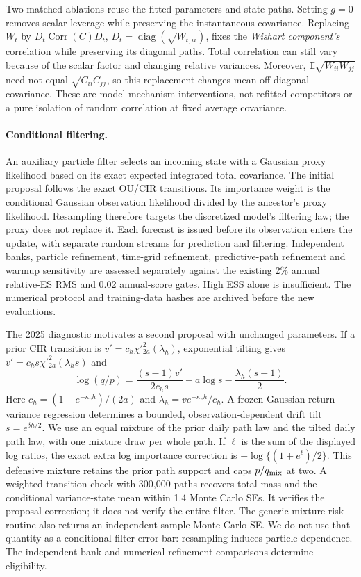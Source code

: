 \documentclass[11pt]{article}
\theoremstyle{definition}\newtheorem{definition}[theorem]{Definition}
\theoremstyle{remark}\newtheorem{remark}[theorem]{Remark}
\newcommand{\E}{\mathbb E}\newcommand{\Prob}{\mathbb P}\newcommand{\R}{\mathbb R}
\begin{document}
Two matched ablations reuse the fitted parameters and state paths. Setting $g=0$ removes scalar leverage while preserving the instantaneous covariance. Replacing $W_t$ by $D_t\operatorname{Corr}(C)D_t$, $D_t=\operatorname{diag}(\sqrt{W_{t,ii}})$, fixes the \emph{Wishart component's} correlation while preserving its diagonal paths. Total correlation can still vary because of the scalar factor and changing relative variances. Moreover, $\E\sqrt{W_{ii}W_{jj}}$ need not equal $\sqrt{C_{ii}C_{jj}}$, so this replacement changes mean off-diagonal covariance. These are model-mechanism interventions, not refitted competitors or a pure isolation of random correlation at fixed average covariance.

\paragraph{Conditional filtering.}
An auxiliary particle filter selects an incoming state with a Gaussian proxy likelihood based on its exact expected integrated total covariance. The initial proposal follows the exact OU/CIR transitions. Its importance weight is the conditional Gaussian observation likelihood divided by the ancestor's proxy likelihood. Resampling therefore targets the discretized model's filtering law; the proxy does not replace it. Each forecast is issued before its observation enters the update, with separate random streams for prediction and filtering. Independent banks, particle refinement, time-grid refinement, predictive-path refinement and warmup sensitivity are assessed separately against the existing 2\% annual relative-ES RMS and 0.02 annual-score gates. High ESS alone is insufficient. The numerical protocol and training-data hashes are archived before the new evaluations.

The 2025 diagnostic motivates a second proposal with unchanged parameters. If a prior CIR transition is $v'=c_h\chi'^2_{2a}(\lambda_h)$, exponential tilting gives $v'=c_hs\chi'^2_{2a}(\lambda_hs)$ and
\[
 \log(q/p)=\frac{(s-1)v'}{2c_hs}-a\log s-\frac{\lambda_h(s-1)}2.
\]
Here $c_h=(1-e^{-\kappa_vh})/(2a)$ and $\lambda_h=v e^{-\kappa_vh}/c_h$. A frozen Gaussian return--variance regression determines a bounded, observation-dependent drift tilt $s=e^{\delta h/2}$. We use an equal mixture of the prior daily path law and the tilted daily path law, with one mixture draw per whole path. If $\ell$ is the sum of the displayed log ratios, the exact extra log importance correction is $-\log\{(1+e^\ell)/2\}$. This defensive mixture retains the prior path support and caps $p/q_{\rm mix}$ at two. A weighted-transition check with 300,000 paths recovers total mass and the conditional variance-state mean within 1.4 Monte Carlo SEs. It verifies the proposal correction; it does not verify the entire filter.
The generic mixture-risk routine also returns an independent-sample Monte Carlo SE. We do not use that quantity as a conditional-filter error bar: resampling induces particle dependence. The independent-bank and numerical-refinement comparisons determine eligibility.
\end{document}
